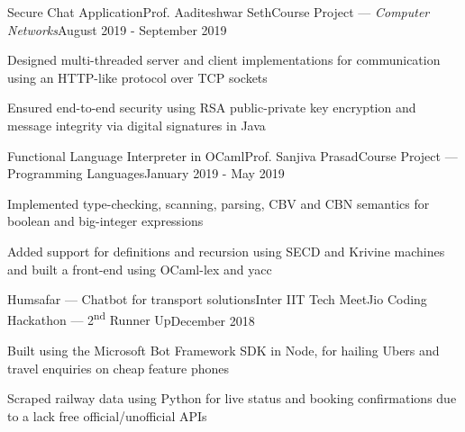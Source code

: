 \documentclass[letterpaper,10pt]{resume}
\begin{document}
\begin{rSubsection}{Secure Chat Application}{Prof. Aaditeshwar Seth}{Course Project --- \textit{Computer Networks}}{August 2019 - September 2019}
	\item Designed multi-threaded server and client implementations for communication using an HTTP-like protocol over TCP sockets
	\item Ensured end-to-end security using RSA public-private key encryption and message integrity via digital signatures in Java
\end{rSubsection}


\begin{rSubsection}{Functional Language Interpreter in OCaml}{Prof. Sanjiva Prasad}{Course Project --- Programming Languages}{January 2019 - May 2019}
\item Implemented type-checking, scanning, parsing, CBV and CBN semantics for boolean and big-integer expressions
\item Added support for definitions and recursion using SECD and Krivine machines and built a front-end using OCaml-lex and yacc
\end{rSubsection}

\begin{rSubsection}{Humsafar --- Chatbot for transport solutions}{Inter IIT Tech Meet}{Jio Coding Hackathon --- 2\textsuperscript{nd} Runner Up}{December 2018}
	\item Built using the Microsoft Bot Framework SDK in Node, for hailing Ubers and travel enquiries on cheap feature phones
	\item Scraped railway data using Python for live status and booking confirmations due to a lack free official/unofficial APIs
\end{rSubsection}


\end{document}
